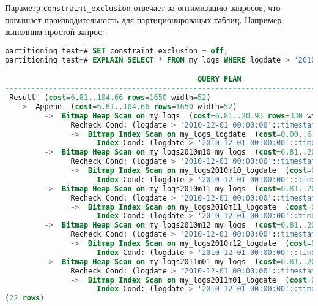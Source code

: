 Параметр \lstinline!constraint_exclusion! отвечает за оптимизацию запросов, что повышает производительность для партиционированых таблиц. Например, выполним простой запрос:

\begin{lstlisting}[language=SQL,label=lst:partitioning14,caption=<<constraint\_exclusion>> OFF]
partitioning_test=# SET constraint_exclusion = off;
partitioning_test=# EXPLAIN SELECT * FROM my_logs WHERE logdate > '2010-12-01';

                                            QUERY PLAN
---------------------------------------------------------------------------------------------------
 Result  (cost=6.81..104.66 rows=1650 width=52)
   ->  Append  (cost=6.81..104.66 rows=1650 width=52)
         ->  Bitmap Heap Scan on my_logs  (cost=6.81..20.93 rows=330 width=52)
               Recheck Cond: (logdate > '2010-12-01 00:00:00'::timestamp without time zone)
               ->  Bitmap Index Scan on my_logs_logdate  (cost=0.00..6.73 rows=330 width=0)
                     Index Cond: (logdate > '2010-12-01 00:00:00'::timestamp without time zone)
         ->  Bitmap Heap Scan on my_logs2010m10 my_logs  (cost=6.81..20.93 rows=330 width=52)
               Recheck Cond: (logdate > '2010-12-01 00:00:00'::timestamp without time zone)
               ->  Bitmap Index Scan on my_logs2010m10_logdate  (cost=0.00..6.73 rows=330 width=0)
                     Index Cond: (logdate > '2010-12-01 00:00:00'::timestamp without time zone)
         ->  Bitmap Heap Scan on my_logs2010m11 my_logs  (cost=6.81..20.93 rows=330 width=52)
               Recheck Cond: (logdate > '2010-12-01 00:00:00'::timestamp without time zone)
               ->  Bitmap Index Scan on my_logs2010m11_logdate  (cost=0.00..6.73 rows=330 width=0)
                     Index Cond: (logdate > '2010-12-01 00:00:00'::timestamp without time zone)
         ->  Bitmap Heap Scan on my_logs2010m12 my_logs  (cost=6.81..20.93 rows=330 width=52)
               Recheck Cond: (logdate > '2010-12-01 00:00:00'::timestamp without time zone)
               ->  Bitmap Index Scan on my_logs2010m12_logdate  (cost=0.00..6.73 rows=330 width=0)
                     Index Cond: (logdate > '2010-12-01 00:00:00'::timestamp without time zone)
         ->  Bitmap Heap Scan on my_logs2011m01 my_logs  (cost=6.81..20.93 rows=330 width=52)
               Recheck Cond: (logdate > '2010-12-01 00:00:00'::timestamp without time zone)
               ->  Bitmap Index Scan on my_logs2011m01_logdate  (cost=0.00..6.73 rows=330 width=0)
                     Index Cond: (logdate > '2010-12-01 00:00:00'::timestamp without time zone)
(22 rows)
\end{lstlisting}

